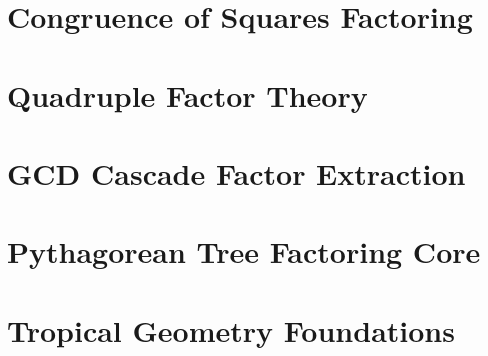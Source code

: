 

\clearpage

\section{Congruence of Squares Factoring}
\label{app:11-CongruenceOfSquaresFactoring}



\clearpage

\section{Quadruple Factor Theory}
\label{app:12-QuadrupleFactorTheory}



\clearpage

\section{GCD Cascade Factor Extraction}
\label{app:13-GCDCascadeFactorExtraction}



\clearpage

\section{Pythagorean Tree Factoring Core}
\label{app:14-PythagoreanTreeFactoringCore}



\clearpage

\section{Tropical Geometry Foundations}
\label{app:15-TropicalGeometryFoundations}

